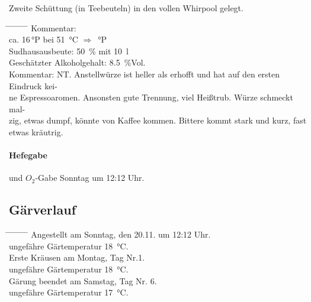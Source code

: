 \documentclass[12pt,oneside,a4paper]{scrartcl}
\begin{document}
\hspace{1cm} Zweite Schüttung (in Teebeuteln) in den vollen Whirpool gelegt.
	\begin{tabbing}
		\hspace{1cm} \= \hspace{1cm} \= \hspace{1cm} \= \hspace{1cm} \= \hspace{1cm} \= \hspace{1cm} \= \hspace{1cm} \= \hspace{1cm} \= \kill
		\> Kommentar: \>\>\>  \\
		\> \> \> ca. 16\,°P \> \> bei \> \SI{51}{\celsius} \> $\Rightarrow$ \,°P\\
		\> \> Sudhausausbeute: \> \> \> \> \>  \SI{50}{\percent} mit \SI{10}{\litre}\\
		\> \> Geschätzter Alkoholgehalt: \> \> \> \> \> \SI{8,5}{\percent}Vol.\\
		\>Kommentar: \>\>\>NT. Anstellwürze ist heller als erhofft und hat auf den ersten Eindruck kei-\\
		\>\>\>ne Espressoaromen. Ansonsten gute Trennung, viel Heißtrub. Würze schmeckt mal-\\
		\>\>\>zig, etwas dumpf, könnte von Kaffee kommen. Bittere kommt stark und kurz, fast\\
		\>\>\>etwas kräutrig.
	\end{tabbing}
%
\paragraph{Hefegabe} und $O_2$-Gabe Sonntag um 12:12 Uhr. 
%
\subsection*{Gärverlauf}
	\begin{tabbing}
		\hspace{1cm} \= \hspace{1cm} \= \hspace{1cm} \= \hspace{1cm} \= \hspace{1cm} \= \hspace{1cm} \= \hspace{1cm} \= \hspace{1cm} \= \kill
		\> Angestellt am Sonntag, den  20.11. um 12:12 Uhr.\\
		\> \> ungefähre Gärtemperatur \SI{18}{\celsius}.\\
		\> Erste Kräusen am Montag, Tag Nr.1.\\
		\> \> ungefähre Gärtemperatur \SI{18}{\celsius}.\\
		\> Gärung beendet am Samstag, Tag Nr. 6.\\
		\> \> ungefähre Gärtemperatur \SI{17}{\celsius}.
	\end{tabbing}
%
\end{document}
